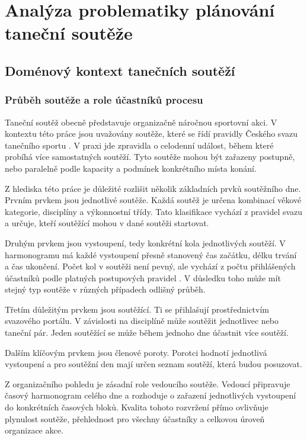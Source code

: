 \documentclass[czech, kiv, ba, he, iso690alph, pdf]{fasthesis}
\begin{document}
	

	\chapter{Analýza problematiky plánování taneční soutěže}
	
		\section{Doménový kontext tanečních soutěží}

			\subsection{Průběh soutěže a role účastníků procesu}
				Taneční soutěž obecně představuje organizačně náročnou sportovní akci. V kontextu této práce jsou uvažovány soutěže, které se řídí pravidly Českého svazu tanečního sportu \cite{csts_soutezni_rad}. V praxi jde zpravidla o celodenní událost, během které probíhá více samostatných soutěží. Tyto soutěže mohou být zařazeny postupně, nebo paralelně podle kapacity a podmínek konkrétního místa konání.
				
				Z hlediska této práce je důležité rozlišit několik základních prvků soutěžního dne. Prvním prvkem jsou jednotlivé soutěže. Každá soutěž je určena kombinací věkové kategorie, disciplíny a výkonnostní třídy. Tato klasifikace vychází z pravidel svazu a určuje, kteří soutěžící mohou v dané soutěži startovat.
				
				Druhým prvkem jsou vystoupení, tedy konkrétní kola jednotlivých soutěží. V harmonogramu má každé vystoupení přesně stanovený čas začátku, délku trvání a čas ukončení. Počet kol v soutěži není pevný, ale vychází z počtu přihlášených účastníků podle platných postupových pravidel \cite{csts_postupove_klice}. V důsledku toho může mít stejný typ soutěže v různých případech odlišný průběh.
				
				Třetím důležitým prvkem jsou soutěžící. Ti se přihlašují prostřednictvím svazového portálu. V závislosti na disciplíně může soutěžit jednotlivec nebo taneční pár. Jeden soutěžící se může během jednoho dne účastnit více soutěží.
				
				Dalším klíčovým prvkem jsou členové poroty. Porotci hodnotí jednotlivá vystoupení a pro soutěžní den mají určen seznam soutěží, která budou posuzovat.
				
				Z organizačního pohledu je zásadní role vedoucího soutěže. Vedoucí připravuje časový harmonogram celého dne a rozhoduje o zařazení jednotlivých vystoupení do konkrétních časových bloků. Kvalita tohoto rozvržení přímo ovlivňuje plynulost soutěže, přehlednost pro všechny účastníky a celkovou úroveň organizace akce.
				
\end{document}
